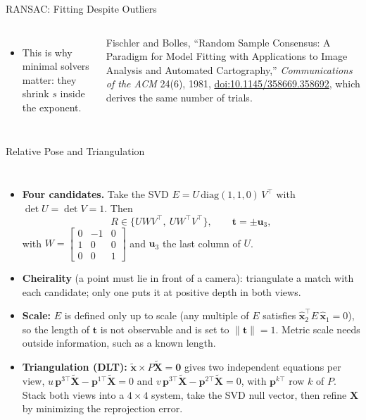 \begin{frame}{RANSAC: Fitting Despite Outliers}
\begin{columns}[T,onlytextwidth]
\begin{itemize}
        \item This is why minimal solvers matter: they shrink $s$ inside the exponent.
      \end{itemize}
      \vspace{0.2em}
      {\scriptsize Fischler and Bolles, ``Random Sample Consensus: A Paradigm for Model Fitting with Applications to Image Analysis and Automated Cartography,'' \emph{Communications of the ACM} 24(6), 1981, \href{https://doi.org/10.1145/358669.358692}{doi:10.1145/358669.358692}, which derives the same number of trials.\par}
  \end{columns}
\end{frame}

\begin{frame}{Relative Pose and Triangulation}
  \begin{columns}[T,onlytextwidth]
      \begin{itemize}\footnotesize\itemsep0.3em
        \item \textbf{Four candidates.} Take the SVD $E=U\,\mathrm{diag}(1,1,0)\,V^\top$ with $\det U=\det V=1$. Then
        \[ R\in\{UWV^\top,\ UW^\top V^\top\},\qquad \mathbf{t}=\pm\mathbf{u}_3, \]
        with $W=\left[\begin{smallmatrix}0&-1&0\\ 1&0&0\\ 0&0&1\end{smallmatrix}\right]$ and $\mathbf{u}_3$ the last column of $U$.
        \item \textbf{Cheirality} (a point must lie in front of a camera): triangulate a match with each candidate; only one puts it at positive depth in both views.
        \item \textbf{Scale:} $E$ is defined only up to scale (any multiple of $E$ satisfies $\hat{\mathbf{x}}_2^\top E\,\hat{\mathbf{x}}_1=0$), so the length of $\mathbf{t}$ is not observable and is set to $\lVert\mathbf{t}\rVert=1$. Metric scale needs outside information, such as a known length.
        \item \textbf{Triangulation (DLT):} $\tilde{\mathbf{x}}\times P\tilde{\mathbf{X}}=\mathbf{0}$ gives two independent equations per view, $u\,\mathbf{p}^{3\top}\tilde{\mathbf{X}}-\mathbf{p}^{1\top}\tilde{\mathbf{X}}=0$ and $v\,\mathbf{p}^{3\top}\tilde{\mathbf{X}}-\mathbf{p}^{2\top}\tilde{\mathbf{X}}=0$, with $\mathbf{p}^{k\top}$ row $k$ of $P$. Stack both views into a $4\times4$ system, take the SVD null vector, then refine $\mathbf{X}$ by minimizing the reprojection error.

\end{itemize}
\end{columns}
\end{frame}
